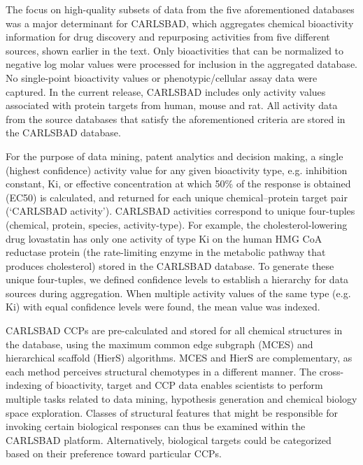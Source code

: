 The focus on high-quality subsets of data from the five aforementioned databases was a major determinant for CARLSBAD, which aggregates chemical bioactivity information for drug discovery and repurposing activities from five different sources, shown earlier in the text. Only bioactivities that can be normalized to negative log molar values were processed for inclusion in the aggregated database. No single-point bioactivity values or phenotypic/cellular assay data were captured. In the current release, CARLSBAD includes only activity values associated with protein targets from human, mouse and rat. All activity data from the source databases that satisfy the aforementioned criteria are stored in the CARLSBAD database.

For the purpose of data mining, patent analytics and decision making, a single (highest confidence) activity value for any given bioactivity type, e.g. inhibition constant, Ki, or effective concentration at which 50\% of the response is obtained (EC50) is calculated, and returned for each unique chemical–protein target pair (‘CARLSBAD activity’). CARLSBAD activities correspond to unique four-tuples (chemical, protein, species, activity-type). For example, the cholesterol-lowering drug lovastatin has only one activity of type Ki on the human HMG CoA reductase protein (the rate-limiting enzyme in the metabolic pathway that produces cholesterol) stored in the CARLSBAD database. To generate these unique four-tuples, we defined confidence levels to establish a hierarchy for data sources during aggregation. When multiple activity values of the same type (e.g. Ki) with equal confidence levels were found, the mean value was indexed.

CARLSBAD CCPs are pre-calculated and stored for all chemical structures in the database, using the maximum common edge subgraph (MCES) and hierarchical scaffold (HierS) algorithms. MCES and HierS are complementary, as each method perceives structural chemotypes in a different manner. The cross-indexing of bioactivity, target and CCP data enables scientists to perform multiple tasks related to data mining, hypothesis generation and chemical biology space exploration. Classes of structural features that might be responsible for invoking certain biological responses can thus be examined within the CARLSBAD platform. Alternatively, biological targets could be categorized based on their preference toward particular CCPs.

